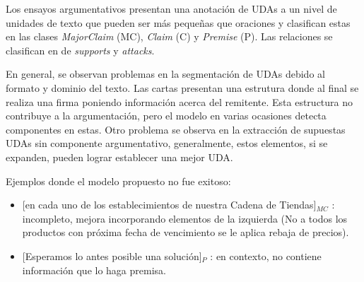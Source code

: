 \documentclass[a4paper,11pt,twocolumn,twoside]{article}
\begin{document}
Los ensayos argumentativos presentan una anotación de UDAs a un nivel de unidades de texto que pueden ser 
más pequeñas que oraciones y clasifican estas en las clases \textit{MajorClaim} (MC), \textit{Claim} (C) y \textit{Premise}
(P). Las relaciones se clasifican en de \textit{supports} y \textit{attacks}. 

En general, se observan problemas en la segmentación de UDAs debido al formato y dominio del texto.
Las cartas presentan una estrutura donde al final se realiza una firma poniendo información acerca del remitente.
Esta estructura no contribuye a la argumentación, pero el modelo en varias ocasiones detecta componentes en estas. 
Otro problema se observa en la extracción de supuestas UDAs sin componente argumentativo,
generalmente, estos elementos, si se expanden, pueden lograr establecer una mejor UDA.

Ejemplos donde el modelo propuesto no fue exitoso:
\begin{itemize}
	\item \text{} [en cada uno de los establecimientos de nuestra Cadena de Tiendas]$_{MC}$
	      : incompleto, mejora incorporando elementos de la izquierda (No a todos los productos con próxima fecha de vencimiento se le aplica rebaja de precios). %
	\item \text{} [Esperamos lo antes posible una solución]$_{P}$
	      : en contexto, no contiene información que lo haga premisa. %
\end{itemize}
\end{document}
